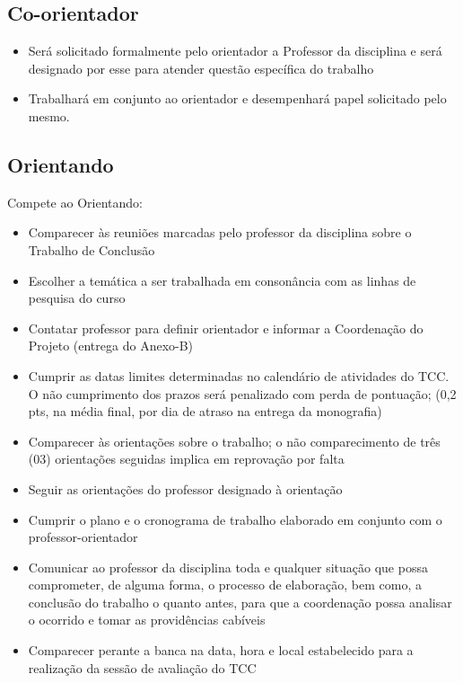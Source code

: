 \subsection{Co-orientador}

	\begin{itemize}	
		\item Será solicitado formalmente pelo orientador a Professor da disciplina e será designado por esse para atender questão específica do trabalho
		
		\item Trabalhará em conjunto ao orientador e desempenhará papel solicitado pelo mesmo.
	\end{itemize}


\subsection{Orientando}

Compete ao Orientando:

	\begin{itemize}
		\item Comparecer às reuniões marcadas pelo professor da disciplina sobre o Trabalho de Conclusão
		
		\item Escolher a temática a ser trabalhada em consonância com as linhas de pesquisa do curso
		
		\item Contatar professor para definir orientador e informar a Coordenação do Projeto (entrega do Anexo-B)
		
		\item Cumprir as datas limites determinadas no calendário de atividades do TCC. O não cumprimento dos prazos será penalizado com perda de pontuação; 
		(0,2 pts, na média final, por dia de atraso na entrega da monografia)
		
		\item Comparecer às orientações sobre o trabalho; o não comparecimento de três (03) orientações seguidas implica em reprovação por falta
		
		\item Seguir as orientações do professor designado à orientação
		
		\item Cumprir o plano e o cronograma de trabalho elaborado em conjunto com o professor-orientador
		
		\item Comunicar ao professor da disciplina toda e qualquer situação que possa comprometer, de alguma forma, o processo de elaboração, bem como, a conclusão do 			trabalho o quanto antes, para que a coordenação possa analisar o ocorrido e tomar as providências cabíveis
		
		\item Comparecer perante a banca na data, hora e local estabelecido para a realização da sessão de avaliação do TCC
	\end{itemize}


